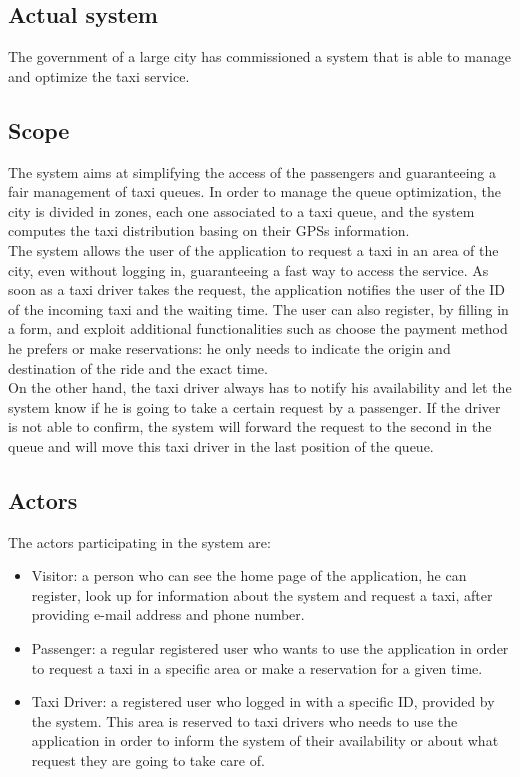 \documentclass[18pt,oneside,a4paper, titlepage]{article}
\begin{document}
	\subsection{Actual system}
		The government of a large city has commissioned a system that is able to manage and optimize the taxi service.
	
	\subsection{Scope}
		The system aims at simplifying the access of the passengers and guaranteeing a fair management of taxi queues.
		In order to manage the queue optimization, the city is divided in zones, each one associated to a taxi queue, and the system computes the taxi distribution basing on their GPSs information.	\\	
		The system allows the user of the application to request a taxi in an area of the city, even without logging in, guaranteeing a fast way to access the service. As soon as a taxi driver takes the request, the application notifies the user of the ID of the incoming taxi and the waiting time. The user can also register, by filling in a form, and exploit additional functionalities such as choose the payment method he prefers or make reservations: he only needs to indicate the origin and destination of the ride and the exact time. \\
		On the other hand, the taxi driver always has to notify his availability and let the system know if he is going to take a certain request by a passenger. If the driver is not able to confirm, the system will forward the request to the second in the queue and will move this taxi driver in the last position of the queue.
	
	\subsection{Actors}
		The actors participating in the system are:
	\begin{itemize}
		\item Visitor: a person who can see the home page of the application, he can register, look up for information about the system and request a taxi, after providing e-mail address and phone number. 
		\item Passenger: a regular registered user who wants to use the application in order to request a taxi in a specific area or make a reservation for a given time.
		\item Taxi Driver: a registered user who logged in with a specific ID, provided by the system. This area is reserved to taxi drivers who needs to use the application in order to inform the system of their availability or about what request they are going to take care of.
	\end{itemize}
	
\end{document}
